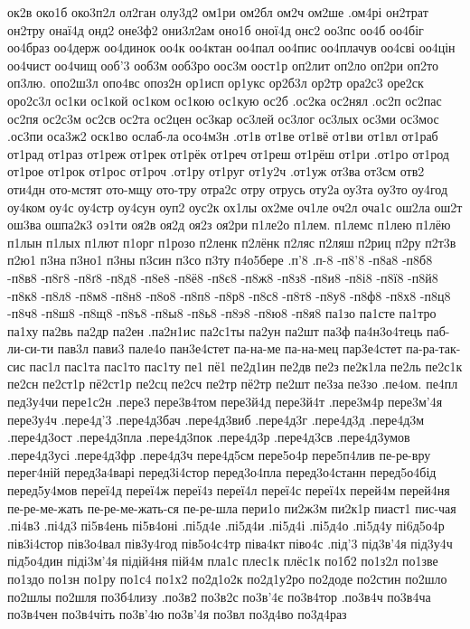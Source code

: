 {{ок2в
око1б
око3п2л
ол2ган
олу3д2
ом1ри
ом2бл
ом2ч
ом2ше
.ом4рі
он2трат
он2тру
онаї4д
онд2
оне3ф2
они3л2ам
оно1б
оної4д
онс2
оо3пс
оо4б
оо4біг
оо4браз
оо4держ
оо4динок
оо4к
оо4ктан
оо4пал
оо4пис
оо4плачув
оо4сві
оо4цін
оо4чист
оо4чищ
ооб'3
ооб3м
ооб3ро
оос3м
оост1р
оп2лит
оп2ло
оп2ри
оп2то
оп3лю.
опо2ш3л
опо4вс
опоз2н
ор1исп
ор1укс
ор2б3л
ор2тр
ора2с3
оре2ск
оро2с3л
ос1ки
ос1кой
ос1ком
ос1кою
ос1кую
ос2б
.ос2ка
ос2нял
.ос2п
ос2пас
ос2пя
ос2с3м
ос2св
ос2та
ос2цен
ос3кар
ос3лей
ос3лог
ос3лых
ос3ми
ос3мос
.ос3пи
оса3ж2
оск1во
ослаб-ла
осо4м3н
.от1в
от1ве
от1вё
от1ви
от1вл
от1раб
от1рад
от1раз
от1реж
от1рек
от1рёк
от1реч
от1реш
от1рёш
от1ри
.от1ро
от1род
от1рое
от1рок
от1рос
от1роч
.от1ру
от1руг
от1у2ч
.от1уж
от3ва
от3см
отв2
оти4дн
ото-мстят
ото-мщу
ото-тру
отра2с
отру
отрусь
оту2а
оу3та
оу3то
оу4год
оу4ком
оу4с
оу4стр
оу4сун
оуп2
оус2к
ох1лы
ох2ме
оч1ле
оч2л
оча1с
ош2ла
ош2т
ош3ва
ошпа2к3
оэ1ти
оя2в
оя2д
оя2з
оя2ри
п1ле2о
п1лем.
п1лемс
п1лею
п1лёю
п1лын
п1лых
п1лют
п1орг
п1розо
п2ленк
п2лёнк
п2ляс
п2ляш
п2риц
п2ру
п2т3в
п2ю1
п3на
п3но1
п3ны
п3син
п3со
п3ту
п4о5бере
.п'8
.п-8
-п8'8
-п8а8
-п8б8
-п8в8
-п8г8
-п8ґ8
-п8д8
-п8е8
-п8ё8
-п8є8
-п8ж8
-п8з8
-п8и8
-п8і8
-п8ї8
-п8й8
-п8к8
-п8л8
-п8м8
-п8н8
-п8о8
-п8п8
-п8р8
-п8с8
-п8т8
-п8у8
-п8ф8
-п8х8
-п8ц8
-п8ч8
-п8ш8
-п8щ8
-п8ъ8
-п8ы8
-п8ь8
-п8э8
-п8ю8
-п8я8
па1зо
па1сте
па1тро
па1ху
па2вь
па2др
па2ен
.па2н1ис
па2с1ты
па2ун
па2шт
па3ф
па4н3о4тець
паб-ли-си-ти
пав3л
пави3
пале4о
пан3е4стет
па-на-ме
па-на-мец
пар3е4стет
па-ра-так-сис
пас1л
пас1та
пас1то
пас1ту
пе1
пё1
пе2д1ин
пе2дв
пе2з
пе2к1ла
пе2ль
пе2с1к
пе2сн
пе2ст1р
пё2ст1р
пе2сц
пе2сч
пе2тр
пё2тр
пе2шт
пе3за
пе3зо
.пе4ом.
пе4пл
пед3у4чи
пере1с2н
.пере3
пере3в4том
пере3й4д
пере3й4т
.пере3м4р
пере3м'4я
пере3у4ч
.пере4д'3
.пере4д3бач
.пере4д3виб
.пере4д3г
.пере4д3д
.пере4д3м
.пере4д3ост
.пере4д3пла
.пере4д3пок
.пере4д3р
.пере4д3св
.пере4д3умов
.пере4д3усі
.пере4д3фр
.пере4д3ч
пере4д5см
пере5о4р
пере5п4лив
пе-ре-вру
перег4ній
перед3а4варі
перед3і4стор
перед3о4пла
перед3о4станн
перед5о4бід
перед5у4мов
переї4д
переї4ж
переї4з
переї4л
переї4с
переї4х
перей4м
перей4ня
пе-ре-ме-жать
пе-ре-ме-жать-ся
пе-ре-шла
пери1о
пи2ж3м
пи2к1р
пиаст1
пис-чая
.пі4в3
.пі4д3
пі5в4ень
пі5в4оні
.пі5д4е
.пі5д4и
.пі5д4і
.пі5д4о
.пі5д4у
пі6д5о4р
пів3і4стор
пів3о4вал
пів3у4год
пів5о4с4тр
піва4кт
піво4с
.під'3
під3в'4я
під3у4ч
під5о4дин
піді3м'4я
підій4ня
пій4м
пла1с
плес1к
плёс1к
по1б2
по1з2л
по1зве
по1здо
по1зн
по1ру
по1с4
по1х2
по2д1о2к
по2д1у2ро
по2доде
по2стин
по2шло
по2шлы
по2шля
по3б4лизу
.по3в2
по3в2с
по3в'4є
по3в4тор
.по3в4ч
по3в4ча
по3в4чен
по3в4чіть
по3в'4ю
по3в'4я
по3вл
по3д4во
по3д4раз
}}
